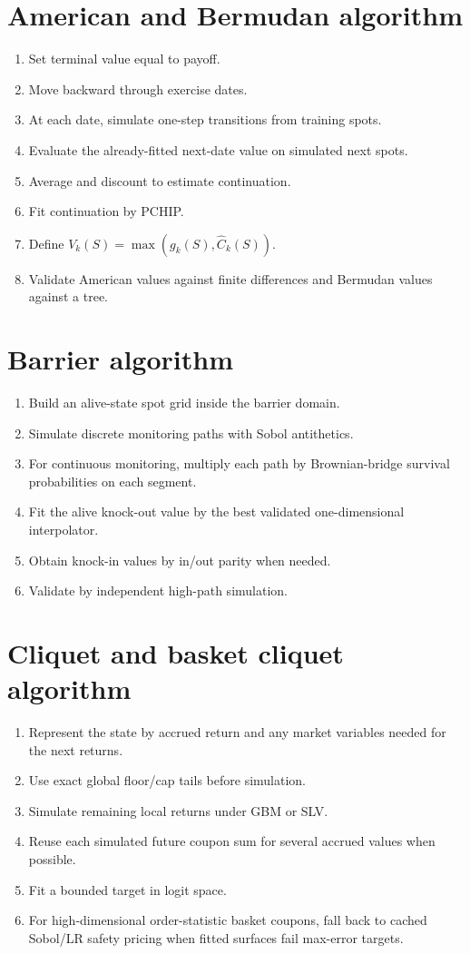\documentclass[11pt,oneside]{book}
\theoremstyle{definition}
\begin{document}
\section{American and Bermudan algorithm}
\begin{enumerate}
  \item Set terminal value equal to payoff.
  \item Move backward through exercise dates.
  \item At each date, simulate one-step transitions from training spots.
  \item Evaluate the already-fitted next-date value on simulated next spots.
  \item Average and discount to estimate continuation.
  \item Fit continuation by PCHIP.
  \item Define \(V_k(S)=\max(g_k(S),\widehat C_k(S))\).
  \item Validate American values against finite differences and Bermudan values against a tree.
\end{enumerate}

\section{Barrier algorithm}
\begin{enumerate}
  \item Build an alive-state spot grid inside the barrier domain.
  \item Simulate discrete monitoring paths with Sobol antithetics.
  \item For continuous monitoring, multiply each path by Brownian-bridge survival probabilities on each segment.
  \item Fit the alive knock-out value by the best validated one-dimensional interpolator.
  \item Obtain knock-in values by in/out parity when needed.
  \item Validate by independent high-path simulation.
\end{enumerate}

\section{Cliquet and basket cliquet algorithm}
\begin{enumerate}
  \item Represent the state by accrued return and any market variables needed for the next returns.
  \item Use exact global floor/cap tails before simulation.
  \item Simulate remaining local returns under GBM or SLV.
  \item Reuse each simulated future coupon sum for several accrued values when possible.
  \item Fit a bounded target in logit space.
  \item For high-dimensional order-statistic basket coupons, fall back to cached Sobol/LR safety pricing when fitted surfaces fail max-error targets.
\end{enumerate}
\end{document}
